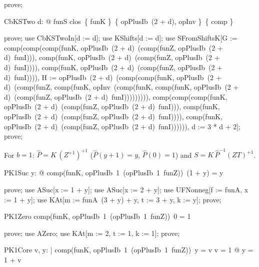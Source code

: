 \documentclass{article}
\begin{document}
\begin{zproof}
prove;
\end{zproof}

\begin{theorem}{CbKSTwo}
  \forall d: \nat @ funS \in clos~\{ funK \}~\{ opPlusIb~(2 + d), opInv \}~\{ comp \}
\end{theorem}

\begin{zproof}
prove;
use CbKSTwoIn[d := d];
use KShifts[d := d];
use SFromShiftsK[G := comp(comp(comp(funK, opPlusIb~(2 + d)~(comp(funZ, opPlusIb~(2 + d)~funI))), comp(funK, opPlusIb~(2 + d)~(comp(funZ, opPlusIb~(2 + d)~funI)))), comp(funK, opPlusIb~(2 + d)~(comp(funZ, opPlusIb~(2 + d)~funI)))), H := opPlusIb~(2 + d)~(comp(comp(funK, opPlusIb~(2 + d)~(comp(funZ, comp(funK, opInv~(comp(funK, comp(funK, opPlusIb~(2 + d)~(comp(funZ, opPlusIb~(2 + d)~funI))))))))), comp(comp(comp(funK, opPlusIb~(2 + d)~(comp(funZ, opPlusIb~(2 + d)~funI))), comp(funK, opPlusIb~(2 + d)~(comp(funZ, opPlusIb~(2 + d)~funI)))), comp(funK, opPlusIb~(2 + d)~(comp(funZ, opPlusIb~(2 + d)~funI)))))), d := 3 * d + 2];
prove;
\end{zproof}

For $b = 1$: $\hat P = K\,(Z^{+1})^{+1}$ ($\hat P(y + 1) = y$, $\hat P(0) = 1$) and
$S = K\,\hat P^{-1} (Z T)^{+1}$.

\begin{theorem}{PK1Suc}
  \forall y: \nat @ comp(funK, opPlusIb~1~(opPlusIb~1~funZ))~(1 + y) = y
\end{theorem}

\begin{zproof}
prove;
use ASuc[x := 1 + y];
use ASuc[x := 2 + y];
use UFNonneg[f := funA, x := 1 + y];
use KAt[m := funA~(3 + y) + y, t := 3 + y, k := y];
prove;
\end{zproof}

\begin{theorem}{PK1Zero}
  comp(funK, opPlusIb~1~(opPlusIb~1~funZ))~0 = 1
\end{theorem}

\begin{zproof}
prove;
use AZero;
use KAt[m := 2, t := 1, k := 1];
prove;
\end{zproof}

\begin{theorem}{PK1Core}
  \forall v, y: \nat | comp(funK, opPlusIb~1~(opPlusIb~1~funZ))~y = v \land \lnot v = 1 @ y = 1 + v
\end{theorem}
\end{document}
